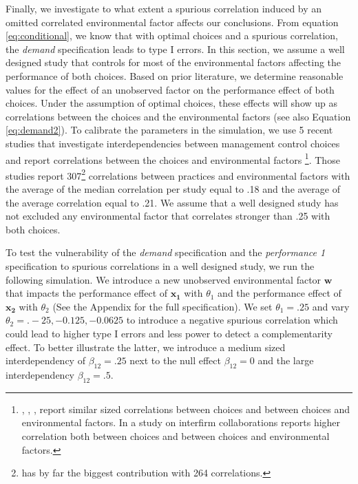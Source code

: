 \documentclass[12pt]{article}
\begin{document}
Finally, we investigate to what extent a spurious correlation induced by
an omitted correlated environmental factor affects our conclusions. From
equation \eqref{eq:conditional}, we know that with optimal choices and a
spurious correlation, the \emph{demand} specification leads to type I
errors. In this section, we assume a well designed study that controls
for most of the environmental factors affecting the performance of both
choices. Based on prior literature, we determine reasonable values for
the effect of an unobserved factor on the performance effect of both
choices. Under the assumption of optimal choices, these effects will
show up as correlations between the choices and the environmental
factors (see also Equation \eqref{eq:demand2}). To calibrate the
parameters in the simulation, we use 5 recent studies that investigate
interdependencies between management control choices and report
correlations between the choices and environmental factors
\citep{Dekker2016, Grabner2016, Bedford2015, Heinicke2016, Abernethy2015a}\footnote{\citet{Grabner2016},
  \citet{Bedford2015}, \citet{Heinicke2016}, \citet{Abernethy2015a}
  report similar sized correlations between choices and between choices
  and environmental factors. In a study on interfirm collaborations
  \citet{Dekker2016} reports higher correlation both between choices and
  between choices and environmental factors.}. Those studies report
307\footnote{\citet{Bedford2015} has by far the biggest contribution
  with 264 correlations.} correlations between practices and
environmental factors with the average of the median correlation per
study equal to .18 and the average of the average correlation equal to
.21. We assume that a well designed study has not excluded any
environmental factor that correlates stronger than .25 with both
choices.

To test the vulnerability of the \emph{demand} specification and the
\emph{performance 1} specification to spurious correlations in a well
designed study, we run the following simulation. We introduce a new
unobserved environmental factor \(\mathbf{w}\) that impacts the
performance effect of \(\mathbf{x_1}\) with \(\theta_1\) and the
performance effect of \(\mathbf{x_2}\) with \(\theta_2\) (See the
Appendix for the full specification). We set \(\theta_1 = .25\) and vary
\(\theta_2 = .-25, -0.125, -0.0625\) to introduce a negative spurious
correlation which could lead to higher type I errors and less power to
detect a complementarity effect. To better illustrate the latter, we
introduce a medium sized interdependency of \(\beta_{12} = .25\) next to
the null effect \(\beta_{12} = 0\) and the large interdependency
\(\beta_{12} = .5\).
\end{document}
